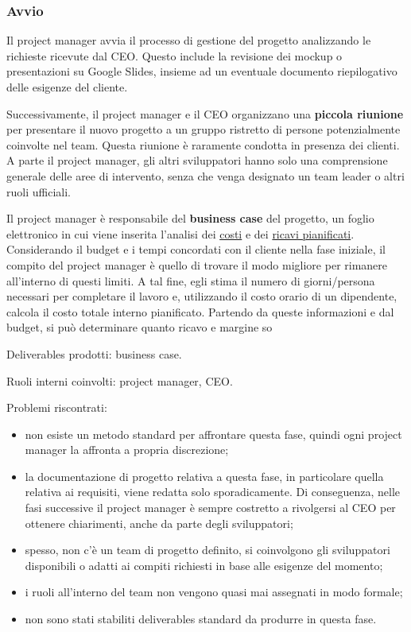         \subsubsection{Avvio}
        Il project manager avvia il processo di gestione del progetto analizzando le richieste ricevute dal CEO. Questo include la
        revisione dei mockup o presentazioni su Google Slides, insieme ad un eventuale documento riepilogativo delle esigenze del cliente.

        Successivamente, il project manager e il CEO organizzano una \textbf{piccola riunione} per presentare il nuovo progetto a un gruppo
        ristretto di persone potenzialmente coinvolte nel team. Questa riunione è raramente condotta in presenza dei clienti. A parte
        il project manager, gli altri sviluppatori hanno solo una comprensione generale delle aree di intervento, senza che venga designato un team leader o altri ruoli ufficiali.
        
        Il project manager è responsabile del \textbf{business case} del progetto, un foglio elettronico in cui viene inserita l'analisi dei \underline{costi}
        e dei \underline{ricavi pianificati}. Considerando il budget e i tempi concordati con il cliente nella fase iniziale, il compito del project manager
        è quello di trovare il modo migliore per rimanere all'interno di questi limiti. A tal fine, egli stima il numero di giorni/persona necessari
        per completare il lavoro e, utilizzando il costo orario di un dipendente, calcola il costo totale interno pianificato. Partendo da queste
        informazioni e dal budget, si può determinare quanto ricavo e margine so

        Deliverables prodotti: business case.

        Ruoli interni coinvolti: project manager, CEO.

        Problemi riscontrati:
        \begin{itemize}
            \item non esiste un metodo standard per affrontare questa fase, quindi ogni project manager la affronta a propria discrezione;
            \item la documentazione di progetto relativa a questa fase, in particolare quella relativa ai requisiti, viene redatta solo sporadicamente.
            Di conseguenza, nelle fasi successive il project manager è sempre costretto a rivolgersi al CEO per ottenere chiarimenti, anche da parte degli sviluppatori;
            \item spesso, non c’è un team di progetto definito, si coinvolgono gli sviluppatori disponibili o adatti ai compiti richiesti in base alle esigenze del momento;
            \item i ruoli all'interno del team non vengono quasi mai assegnati in modo formale;            
            \item non sono stati stabiliti deliverables standard da produrre in questa fase.
        \end{itemize}

